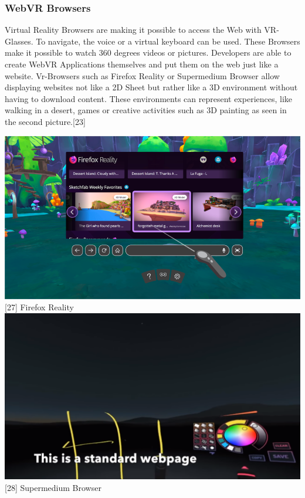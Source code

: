 \documentclass[runningheads]{llncs}
\begin{document}
			\subsubsection{WebVR Browsers}
				\leavevmode\newline
				Virtual Reality Browsers are making it possible to access the Web with VR-Glasses. To navigate, the voice or a virtual keyboard can be used. These Browsers make it possible to watch 360 degrees videos or pictures. Developers are able to create WebVR Applications themselves and put them on the web just like a website. Vr-Browsers such as Firefox Reality or Supermedium Browser allow displaying websites not like a 2D Sheet but rather like a 3D environment without having to download content. These environments can represent experiences, like walking in a desert, games or creative activities such as 3D painting as seen in the second picture.[23]
			\begin{center}
				\includegraphics[scale=0.35]{Firefox_Reality.png}
				[27]	Firefox Reality
				\includegraphics[scale=0.35]{Supermedium.png}
				[28] Supermedium Browser
			\end{center}
\end{document}
